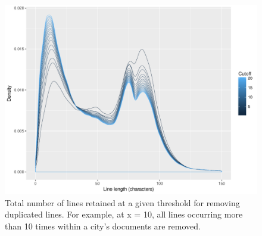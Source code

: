\documentclass[11pt]{article}
\begin{document}









\begin{figure}[htp]
	\centering %
	\includegraphics[width=\linewidth]{figures/linesCutoffIN.pdf}
		\caption{Total number of lines retained at a given threshold for removing duplicated lines. For example, at x = 10, all lines occurring more than 10 times within a city's documents are removed.}
	\label{linesCutoff}
\end{figure}
\end{document}
